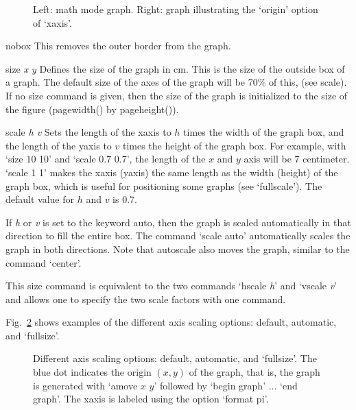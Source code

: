 \begin{commanddescription}
\begin{figure}[tb]
\centering
\mbox{}
\caption{\label{grmath:fig}Left: math mode graph. Right: graph illustrating the `{\sf origin}' option of `{\sf xaxis}'.}
\end{figure}


\item[{\sf nobox}]
This removes the outer border from the graph.

\item[{\sf size {\it x y }}]
Defines the size of the graph in cm.  This is the size of the outside box of a graph. The default size of the axes of the graph will be 70\% of this, (see {\sf scale}). If no {\sf size} command is given, then the size of the graph is initialized to the size of the figure ({\sf pagewidth()} by {\sf pageheight()}).

\item[{\sf scale {\it h v}}]
Sets the length of the xaxis to $h$ times the width of the graph box, and the length of the yaxis to $v$ times the height of the graph box. For example, with `{\sf size 10 10}' and `{\sf scale 0.7 0.7}', the length of the $x$ and $y$ axis will be 7 centimeter. `{\sf scale 1 1}' makes the xaxis (yaxis) the same length as the width (height) of the graph box, which is useful for positioning some graphs (see `{\sf fullscale}'). The default value for $h$ and $v$ is 0.7.

If {\it h} or {\it v} is set to the keyword {\sf auto}, then the graph is scaled automatically in that direction to fill the entire box. The command `{\sf scale auto}' automatically scales the graph in both directions. Note that autoscale also moves the graph, similar to the command `{\sf center}'.

This {\sf size} command is equivalent to the two commands `{\sf hscale {\it h}}' and `{\sf vscale {\it v}}' and allows one to specify the two scale factors with one command.

Fig.~\ref{grscale:fig} shows examples of the different axis scaling options: default, automatic, and `{\sf fullsize}'.

\begin{figure}[tb]
\centering
\mbox{}
\caption{\label{grscale:fig}Different axis scaling options: default, automatic, and `{\sf fullsize}'. The blue dot indicates the origin $(x,y)$ of the graph, that is, the graph is generated with `{\sf amove $x$ $y$}' followed by `{\sf begin graph}' ... `{\sf end graph}'. The xaxis is labeled using the option `{\sf format pi}'.}
\end{figure}


\end{commanddescription}
